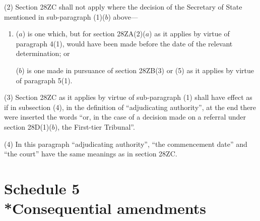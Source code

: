 \documentclass[12pt,a4paper]{article}
\begin{document}
{(2) Section 28ZC shall not apply where the decision of the Secretary of State mentioned in sub-paragraph (1)($b$) above---
\begin{enumerate}\item[]
($a$) is one which, but for section 28ZA(2)($a$) as it applies by virtue of paragraph 4(1), would have been made before the date of the relevant determination; or

($b$) is one made in pursuance of section 28ZB(3) or (5) as it applies by virtue of paragraph 5(1).
\end{enumerate}

(3) Section 28ZC as it applies by virtue of sub-paragraph (1) shall have effect as if in subsection (4), in the definition of “adjudicating authority”, at the end there were inserted the words “or, in the case of a decision made on a referral under section 28D(1)($b$), the First-tier Tribunal”.

(4) In this paragraph “adjudicating authority”, “the commencement date” and “the court” have the same meanings as in section 28ZC.


}

\part[Schedule 5 --- Consequential amendments]{Schedule 5\\*Consequential amendments}

\renewcommand\parthead{--- Schedule 5}


%
%
%
\end{document}
